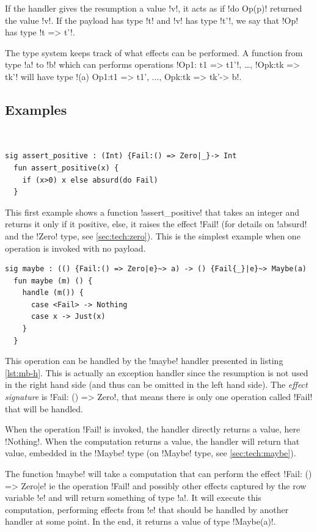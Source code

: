 \documentclass[11pt, nonacm=true, language=french, language=english]{acmart}
\begin{document}
If the handler gives the resumption a value !v!, it acts as if !do Op(p)! returned the value !v!. If the payload has type !t! and !v! has type !t'!, we say that !Op! has type !t => t'!.

The type system keeps track of what effects can be performed. A function from type !a! to !b! which can performs operations !Op1: t1 => t1'!, \dots, !Opk:tk => tk'! will have type !(a) {Op1:t1 => t1', ..., Opk:tk => tk'}-> b!.


\subsection{Examples}

\begin{ex} \

\begin{lstlisting}[caption=Fail invocation]
  sig assert_positive : (Int) {Fail:() => Zero|_}-> Int
  fun assert_positive(x) {
    if (x>0) x else absurd(do Fail)
  }
\end{lstlisting}

This first example shows a function !assert_positive! that takes an integer and returns it only if it positive, else, it raises the effect !Fail! (for details on !absurd! and the !Zero! type, see \ref{sec:tech:zero}). This is the simplest example when one operation is invoked with no payload.

\begin{lstlisting}[caption=maybe handler, label=lst:mb-h]
  sig maybe : (() {Fail:() => Zero|e}~> a) -> () {Fail{_}|e}~> Maybe(a)
  fun maybe (m) () {
    handle (m()) {
      case <Fail> -> Nothing
      case x -> Just(x)
    }
  }
\end{lstlisting}

This operation can be handled by the !maybe! handler presented in listing \ref{lst:mb-h}. This is actually an exception handler since the resumption is not used in the right hand side (and thus can be omitted in the left hand side). The \emph{effect signature} is !{Fail: () => Zero}!, that means there is only one operation called !Fail! that will be handled.

When the operation !Fail! is invoked, the handler directly returns a value, here !Nothing!. When the computation returns a value, the handler will return that value, embedded in the !Maybe! type (on !Maybe! type, see \ref{sec:tech:maybe}).

The function !maybe! will take a computation that can perform the effect !{Fail: () => Zero|e}! ie the operation !Fail! and possibly other effects captured by the row variable !e! and will return something of type !a!. It will execute this computation, performing effects from !e! that should be handled by another handler at some point. In the end, it returns a value of type !Maybe(a)!.


\end{ex}
\end{document}
